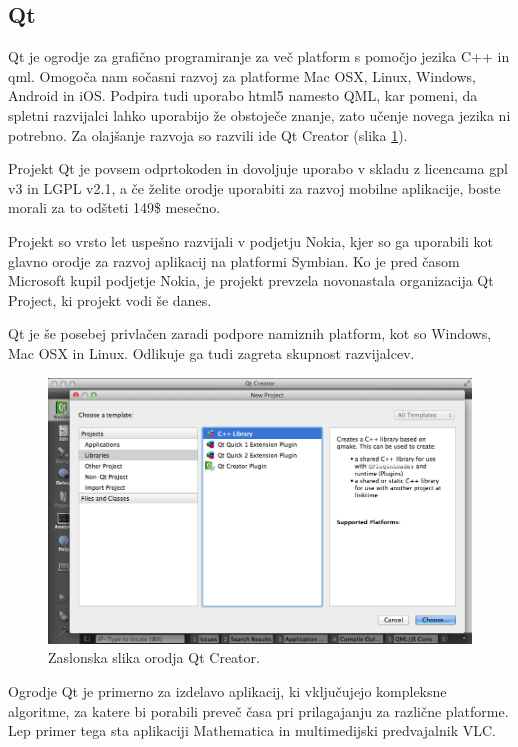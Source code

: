 \subsection{Qt}

Qt\cite{qt} je ogrodje za grafično programiranje za več platform s pomočjo jezika C++ in \gls{qml}. Omogoča nam sočasni razvoj za platforme Mac OSX, Linux, Windows, Android in iOS. Podpira tudi uporabo \gls{html5} namesto QML, kar pomeni, da spletni razvijalci lahko uporabijo že obstoječe znanje, zato učenje novega jezika ni potrebno. Za olajšanje razvoja so razvili \gls{ide} Qt Creator (slika \ref{fig:qt-creator}).

Projekt Qt je povsem odprtokoden in dovoljuje uporabo v skladu z licencama \gls{gpl} v3\cite{gpl} in LGPL v2.1\cite{lgpl}, a če želite orodje uporabiti za razvoj mobilne aplikacije, boste morali za to odšteti 149\$ mesečno.

Projekt so vrsto let uspešno razvijali v podjetju Nokia, kjer so ga uporabili kot glavno orodje za razvoj aplikacij na platformi Symbian. Ko je pred časom Microsoft kupil podjetje Nokia, je projekt prevzela novonastala organizacija Qt Project, ki projekt vodi še danes.

Qt je še posebej privlačen zaradi podpore namiznih platform, kot so Windows, Mac OSX in Linux. Odlikuje ga tudi zagreta skupnost razvijalcev.

\begin{figure}
 \includegraphics[width=\linewidth]{qt-creator}
 \caption{Zaslonska slika orodja Qt Creator.}
 \label{fig:qt-creator}
\end{figure}

Ogrodje Qt je primerno za izdelavo aplikacij, ki vključujejo kompleksne algoritme, za katere bi porabili preveč časa pri prilagajanju za različne platforme. Lep primer tega sta aplikaciji Mathematica\cite{mathematica} in multimedijski predvajalnik VLC\cite{vlc}.

